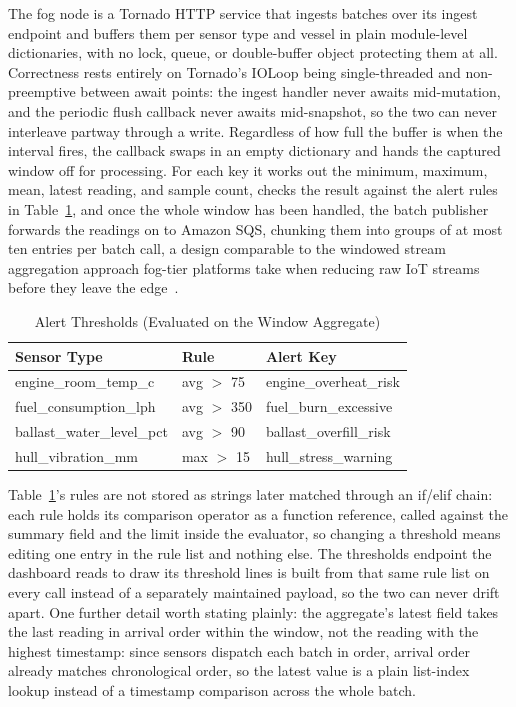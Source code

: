\documentclass[conference]{IEEEtran}
\begin{document}
The fog node is a Tornado HTTP service that ingests batches over its ingest endpoint and buffers them per sensor type and vessel in plain module-level dictionaries, with no lock, queue, or double-buffer object protecting them at all. Correctness rests entirely on Tornado's IOLoop being single-threaded and non-preemptive between await points: the ingest handler never awaits mid-mutation, and the periodic flush callback never awaits mid-snapshot, so the two can never interleave partway through a write. Regardless of how full the buffer is when the interval fires, the callback swaps in an empty dictionary and hands the captured window off for processing. For each key it works out the minimum, maximum, mean, latest reading, and sample count, checks the result against the alert rules in Table~\ref{tab:alerts}, and once the whole window has been handled, the batch publisher forwards the readings on to Amazon SQS, chunking them into groups of at most ten entries per batch call, a design comparable to the windowed stream aggregation approach fog-tier platforms take when reducing raw IoT streams before they leave the edge~\cite{ref4}.

\begin{table}[!t]
\caption{Alert Thresholds (Evaluated on the Window Aggregate)}
\label{tab:alerts}
\centering
\scriptsize
\setlength{\tabcolsep}{4pt}
\begin{tabular}{|l|l|l|}
\hline
\textbf{Sensor Type} & \textbf{Rule} & \textbf{Alert Key} \\
\hline
engine\_room\_temp\_c & avg $>$ 75 & engine\_overheat\_risk \\
\hline
fuel\_consumption\_lph & avg $>$ 350 & fuel\_burn\_excessive \\
\hline
ballast\_water\_level\_pct & avg $>$ 90 & ballast\_overfill\_risk \\
\hline
hull\_vibration\_mm & max $>$ 15 & hull\_stress\_warning \\
\hline
\end{tabular}
\end{table}

Table~\ref{tab:alerts}'s rules are not stored as strings later matched through an if/elif chain: each rule holds its comparison operator as a function reference, called against the summary field and the limit inside the evaluator, so changing a threshold means editing one entry in the rule list and nothing else. The thresholds endpoint the dashboard reads to draw its threshold lines is built from that same rule list on every call instead of a separately maintained payload, so the two can never drift apart. One further detail worth stating plainly: the aggregate's latest field takes the last reading in arrival order within the window, not the reading with the highest timestamp: since sensors dispatch each batch in order, arrival order already matches chronological order, so the latest value is a plain list-index lookup instead of a timestamp comparison across the whole batch.
\end{document}
